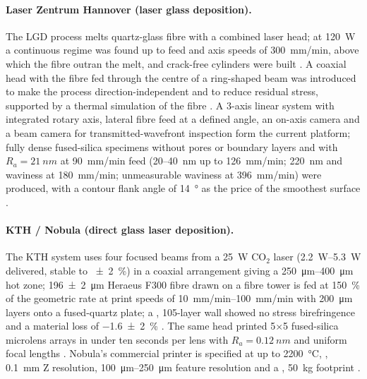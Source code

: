 \paragraph{Laser Zentrum Hannover (laser glass deposition).} The LGD process melts quartz-glass fibre with a combined laser head; at \SI{120}{W} a continuous regime was found up to feed and axis speeds of \SI{300}{mm/min}, above which the fibre outran the melt, and crack-free cylinders were built \citep{witzendorff2018}. A coaxial head with the fibre fed through the centre of a ring-shaped beam was introduced to make the process direction-independent and to reduce residual stress, supported by a thermal simulation of the fibre \citep{lgd2021coaxial}. A 3-axis linear system with integrated rotary axis, lateral fibre feed at a defined angle, an on-axis camera and a beam camera for transmitted-wavefront inspection form the current platform; fully dense fused-silica specimens without pores or boundary layers and with \(R_a = \SI{21}{nm}\) at \SI{90}{mm/min} feed (\SI{20}{}--\SI{40}{nm} up to \SI{126}{mm/min}; \SI{220}{nm} and waviness at \SI{180}{mm/min}; unmeasurable waviness at \SI{396}{mm/min}) were produced, with a contour flank angle of \SI{14}{\degree} as the price of the smoothest surface \citep{lgd2024homog,lgd2022fibers,grotesk2022}.

\paragraph{KTH / Nobula (direct glass laser deposition).} The KTH system uses four focused beams from a \SI{25}{W} CO$_2$ laser (\SIrange{2.2}{5.3}{W} delivered, stable to \SI{+-2}{\percent}) in a coaxial arrangement giving a \SIrange{250}{400}{\micro\metre} hot zone; \SI{196 +- 2}{\micro\metre} Heraeus F300 fibre drawn on a fibre tower is fed at \SI{150}{\percent} of the geometric rate at print speeds of \SIrange{10}{100}{mm/min} with \SI{200}{\micro\metre} layers onto a  fused-quartz plate; a , 105-layer wall showed no stress birefringence and a material loss of \SI{-1.6 +- 2}{\percent} \citep{kth2022bonding}. The same head printed 5\(\times\)5 fused-silica microlens arrays in under ten seconds per lens with \(R_a = \SI{0.12}{nm}\) and uniform focal lengths \citep{kth2024microlens}. Nobula's commercial printer is specified at up to \SI{2200}{\celsius}, , \SI{0.1}{mm} Z resolution, \SIrange{100}{250}{\micro\metre} feature resolution and a , \SI{50}{kg} footprint \citep{nobula_aniwaa,nobula_fabbaloo,threednatives2025}.

